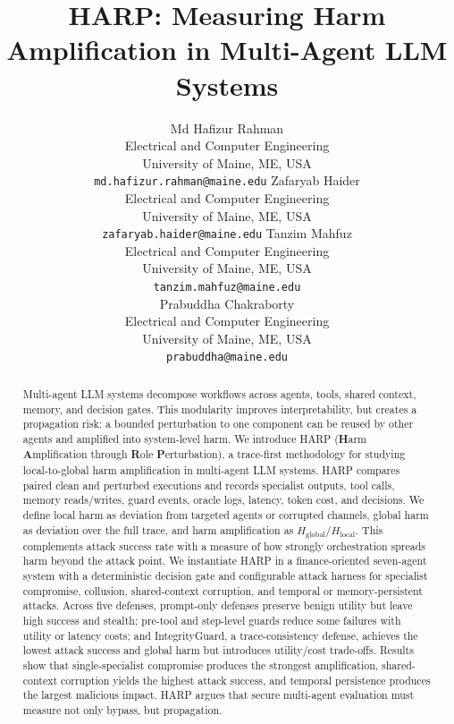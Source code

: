 \documentclass{article}
\title{HARP: Measuring Harm Amplification in Multi-Agent LLM Systems}
\author{%
 Md Hafizur Rahman \\
  Electrical and Computer Engineering \\
  University of Maine, ME, USA \\
  \texttt{md.hafizur.rahman@maine.edu}
  \And
  Zafaryab Haider \\
  Electrical and Computer Engineering \\
  University of Maine, ME, USA \\
  \texttt{zafaryab.haider@maine.edu}
  \And
  Tanzim Mahfuz \\
  Electrical and Computer Engineering \\
  University of Maine, ME, USA \\
  \texttt{tanzim.mahfuz@maine.edu} \\
  \And 
  Prabuddha Chakraborty \\
  Electrical and Computer Engineering \\
  University of Maine, ME, USA \\
  \texttt{prabuddha@maine.edu} \\
}
\begin{document}
\maketitle

\begin{abstract}
Multi-agent LLM systems decompose workflows across agents, tools, shared context,
memory, and decision gates. This modularity improves interpretability, but creates
a propagation risk: a bounded perturbation to one component can be reused by
other agents and amplified into system-level harm. We introduce HARP (\textbf{H}arm \textbf{A}mplification through \textbf{R}ole \textbf{P}erturbation), a trace-first methodology for studying local-to-global harm amplification in
multi-agent LLM systems. HARP compares paired clean and perturbed executions and
records specialist outputs, tool calls, memory reads/writes, guard events, oracle
logs, latency, token cost, and decisions. We define local harm as deviation from
targeted agents or corrupted channels, global harm as deviation over the full
trace, and harm amplification as \(H_{\mathrm{global}}/H_{\mathrm{local}}\).
This complements attack success rate with a measure of how strongly
orchestration spreads harm beyond the attack point. We instantiate HARP in a
finance-oriented seven-agent system with a deterministic decision gate and
configurable attack harness for specialist compromise, collusion, shared-context
corruption, and temporal or memory-persistent attacks. Across five defenses,
prompt-only defenses preserve benign utility but leave high success and stealth;
pre-tool and step-level guards reduce some failures with utility or latency
costs; and IntegrityGuard, a trace-consistency defense, achieves the lowest
attack success and global harm but introduces utility/cost trade-offs. Results
show that single-specialist compromise produces the strongest amplification,
shared-context corruption yields the highest attack success, and temporal
persistence produces the largest malicious impact. HARP argues that secure
multi-agent evaluation must measure not only bypass, but propagation.
\end{abstract}
















\newpage

\end{document}
